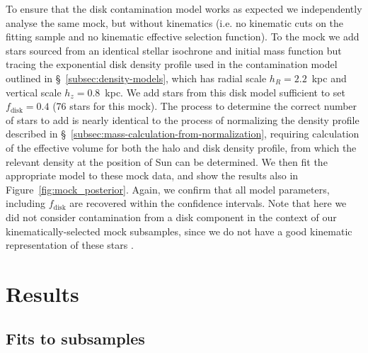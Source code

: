 To ensure that the disk contamination model works as expected we independently analyse the same mock, but without kinematics (i.e. no kinematic cuts on the fitting sample and no kinematic effective selection function). To the mock we add stars sourced from an identical stellar isochrone and initial mass function but tracing the exponential disk density profile used in the contamination model outlined in \S~\ref{subsec:density-models}, which has radial scale $h_{R} = 2.2$~kpc and vertical scale $h_{z} = 0.8$~kpc. We add stars from this disk model sufficient to set $f_\mathrm{disk}=0.4$ (76 stars for this mock). The process to determine the correct number of stars to add is nearly identical to the process of normalizing the density profile described in \S~\ref{subsec:mass-calculation-from-normalization}, requiring calculation of the effective volume for both the halo and disk density profile, from which the relevant density at the position of Sun can be determined. We then fit the appropriate model to these mock data, and show the results also in Figure~\ref{fig:mock_posterior}. Again, we confirm that all model parameters, including $f_\mathrm{disk}$ are recovered within the confidence intervals. Note that here we did not consider contamination from a disk component in the context of our kinematically-selected mock subsamples, since we do not have a good kinematic representation of these stars \parencite[see][ and discussion above]{lane22}.

\section{Results}
\label{sec:results}

\subsection{Fits to \gse subsamples}
\label{subsec:fits-to-gse}



